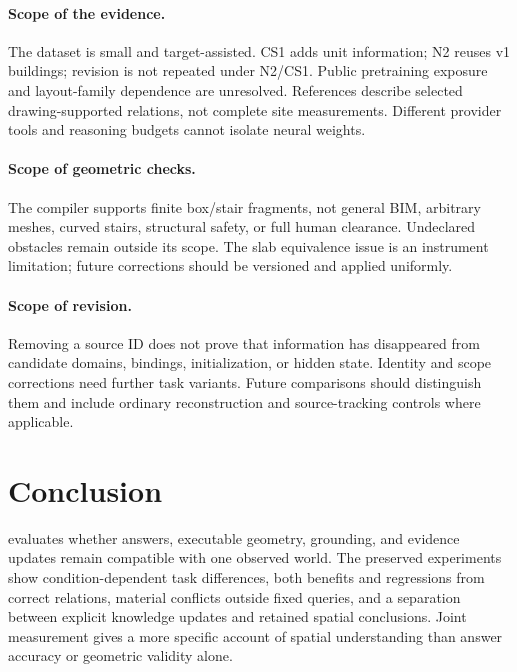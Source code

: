 \paragraph{Scope of the evidence.}
The dataset is small and target-assisted. CS1 adds unit information;
N2 reuses v1 buildings; revision is not repeated under N2/CS1.
Public pretraining exposure and layout-family dependence are unresolved.
References describe selected drawing-supported relations, not complete
site measurements. Different provider tools and reasoning budgets
cannot isolate neural weights.

\paragraph{Scope of geometric checks.}
The compiler supports finite box/stair fragments, not general BIM,
arbitrary meshes, curved stairs, structural safety, or full human
clearance. Undeclared obstacles remain outside its scope.
The slab equivalence issue is an instrument limitation; future
corrections should be versioned and applied uniformly.

\paragraph{Scope of revision.}
Removing a source ID does not prove that information has disappeared
from candidate domains, bindings, initialization, or hidden state.
Identity and scope corrections need further task variants.
Future comparisons should distinguish them and include ordinary
reconstruction and source-tracking controls where applicable.

\section{Conclusion}
\tw{} evaluates whether answers, executable geometry, grounding,
and evidence updates remain compatible with one observed world.
The preserved experiments show condition-dependent task differences,
both benefits and regressions from correct relations, material
conflicts outside fixed queries, and a separation between explicit
knowledge updates and retained spatial conclusions.
Joint measurement gives a more specific account of spatial
understanding than answer accuracy or geometric validity alone.

